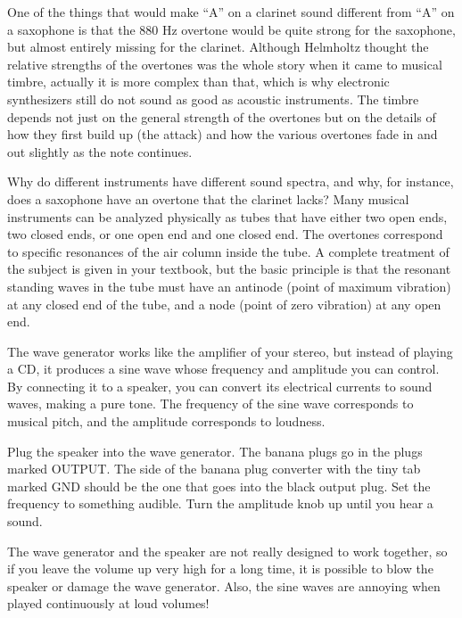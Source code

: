 One of the things that would make ``A'' on a clarinet sound
different from ``A'' on a saxophone is that the 880 Hz
overtone would be quite strong for the saxophone, but almost
entirely missing for the clarinet.  Although Helmholtz
thought the relative strengths of the overtones was the
whole story when it came to musical timbre, actually it is
more complex than that, which is why electronic synthesizers
still do not sound as good as acoustic instruments.  The
timbre depends not just on the general strength of the
overtones but on the details of how they first build up (the
attack) and how the various overtones fade in and out
slightly as the note continues.

Why do different instruments have different sound spectra,
and why, for instance, does a saxophone have an overtone
that the clarinet lacks?  Many musical instruments can be
analyzed physically as tubes that have either two open ends,
two closed ends, or one open end and one closed end.  The
overtones correspond to specific resonances of the air
column inside the tube.  A complete treatment of the subject
is given in your textbook, but the basic principle is that
the resonant standing waves in the tube must have an
antinode (point of maximum vibration) 
at any closed end of the tube, and a node (point of zero
vibration) at any open end.


The wave generator works like the amplifier of your stereo,
but instead of playing a CD, it produces a sine wave whose
frequency and amplitude you can control.  By connecting it
to a speaker, you can convert its electrical currents to
sound waves, making a pure tone.  The frequency of the sine
wave corresponds to musical pitch, and the amplitude
corresponds to loudness.

\setup

Plug the speaker into the wave generator.  The banana plugs
go in the plugs marked OUTPUT. The side of
the banana plug converter with the tiny tab marked GND should be the one that
goes into the black output plug.  Set the frequency to
something audible.  Turn the amplitude knob up until you hear a sound.

The wave generator and the speaker are not really designed
to work together, so if you leave the volume up very high
for a long time, it is possible to blow the speaker or
damage the wave generator.  Also, the sine waves are
annoying when played continuously at loud volumes!

